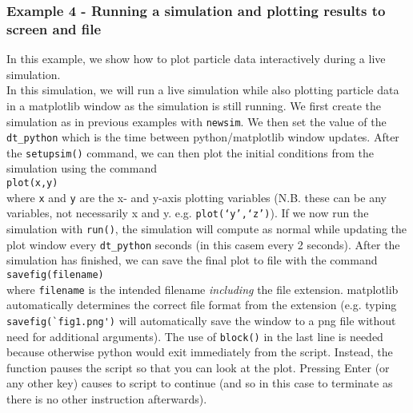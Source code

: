 \documentclass[a4paper]{article}
\newcommand{\var}[1]{\texttt{#1}}
\newcommand{\singlecommand}[1]{\\ \newline \indent \var{#1} \\ \newline \noindent}
\begin{document}
\subsubsection{Example 4 - Running a simulation and plotting results to screen and file}
In this example, we show how to plot particle data interactively during a live simulation. \\






\noindent In this simulation, we will run a live simulation while also plotting particle data in a matplotlib window as the simulation is still running.  We first create the simulation as in previous examples with \var{newsim}.  We then set the value of the \var{dt\_python} which is the time between python/matplotlib window updates.  After the \var{setupsim()} command, we can then plot the initial conditions from the simulation using the command \singlecommand{plot(x,y)} where \var{x} and \var{y} are the x- and y-axis plotting variables (N.B. these can be any variables, not necessarily x and y. e.g. \var{plot(`y',`z')}).  If we now run the simulation with \var{run()}, the simulation will compute as normal while updating the plot window every \var{dt\_python} seconds (in this casem every 2 seconds).  After the simulation has finished, we can save the final plot to file with the command \singlecommand{savefig(filename)} where \var{filename} is the intended filename {\it including} the file extension.  matplotlib automatically determines the correct file format from the extension  (e.g. typing \lstinline{savefig(`fig1.png')} will automatically save the window to a png file without need for additional arguments). The use of \var{block()} in the last line is needed because otherwise python would exit immediately from the script. Instead, the function pauses the script so that you can look at the plot. Pressing Enter (or any other key) causes to script to continue (and so in this case to terminate as there is no other instruction afterwards).
\end{document}

